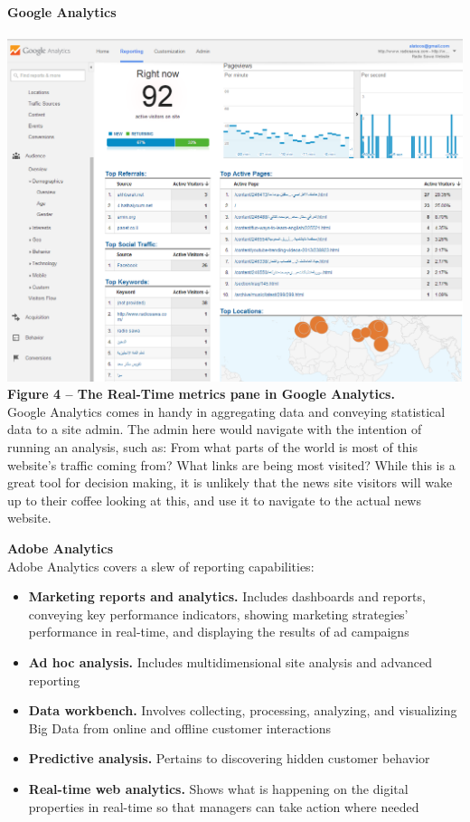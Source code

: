 \documentclass[12pt]{article}
\begin{document}
\noindent\textbf{Google Analytics} \\ \\
\noindent\includegraphics[scale=0.4]{img/google_analytics} \\
\noindent\textbf{Figure 4 -- The Real-Time metrics pane in Google Analytics.} \\

Google Analytics comes in handy in aggregating data and conveying statistical data to a site admin. The admin here would navigate with the intention of running an analysis, such as: From what parts of the world is most of this website's traffic coming from? What links are being most visited?
While this is a great tool for decision making, it is unlikely that the news site visitors will wake up to their coffee looking at this, and use it to navigate to the actual news website. \\

\newpage

\noindent\textbf{Adobe Analytics} \\


Adobe Analytics covers a slew of reporting capabilities:

\begin{itemize}
\item \textbf{Marketing reports and analytics.} Includes dashboards and reports, conveying key performance indicators, showing marketing strategies' performance in real-time, and displaying the results of ad campaigns
\item \textbf{Ad hoc analysis.} Includes multidimensional site analysis and advanced reporting
\item \textbf{Data workbench.} Involves collecting, processing, analyzing, and visualizing Big Data from online and offline customer interactions
\item \textbf{Predictive analysis.} Pertains to discovering hidden customer behavior
\item \textbf{Real-time web analytics.} Shows what is happening on the digital properties in real-time so that managers can take action where needed
\end{itemize}
\end{document}
